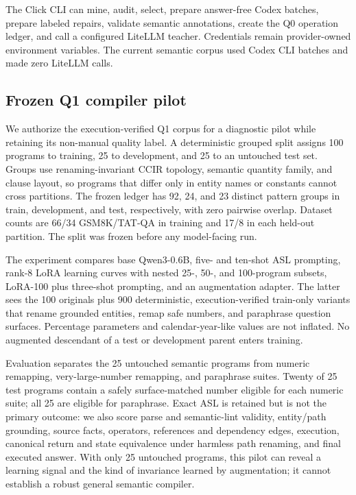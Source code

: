 \documentclass[11pt]{article}
\begin{document}
The Click CLI can mine, audit, select, prepare answer-free Codex batches, prepare
labeled repairs, validate semantic annotations, create the Q0 operation ledger,
and call a configured LiteLLM teacher. Credentials remain provider-owned
environment variables. The current semantic corpus used Codex CLI batches and
made zero LiteLLM calls.

\subsection{Frozen Q1 compiler pilot}

We authorize the execution-verified Q1 corpus for a diagnostic pilot while
retaining its non-manual quality label. A deterministic grouped split assigns
100 programs to training, 25 to development, and 25 to an untouched test set.
Groups use renaming-invariant CCIR topology, semantic quantity family, and clause
layout, so programs that differ only in entity names or constants cannot cross
partitions. The frozen ledger has 92, 24, and 23 distinct pattern groups in
train, development, and test, respectively, with zero pairwise overlap. Dataset
counts are 66/34 GSM8K/TAT-QA in training and 17/8 in each held-out partition.
The split was frozen before any model-facing run.

The experiment compares base Qwen3-0.6B, five- and ten-shot ASL prompting,
rank-8 LoRA learning curves with nested 25-, 50-, and 100-program subsets,
LoRA-100 plus three-shot prompting, and an augmentation adapter. The latter sees
the 100 originals plus 900 deterministic, execution-verified train-only variants
that rename grounded entities, remap safe numbers, and paraphrase question
surfaces. Percentage parameters and calendar-year-like values are not inflated.
No augmented descendant of a test or development parent enters training.

Evaluation separates the 25 untouched semantic programs from numeric remapping,
very-large-number remapping, and paraphrase suites. Twenty of 25 test programs
contain a safely surface-matched number eligible for each numeric suite; all 25
are eligible for paraphrase. Exact ASL is retained but is not the primary outcome:
we also score parse and semantic-lint validity, entity/path grounding, source
facts, operators, references and dependency edges, execution, canonical return
and state equivalence under harmless path renaming, and final executed answer.
With only 25 untouched programs, this pilot can reveal a learning signal and the
kind of invariance learned by augmentation; it cannot establish a robust general
semantic compiler.
\end{document}

